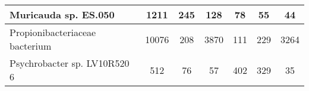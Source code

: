 \begin{minipage}{0.91\textwidth}
\begin{adjustbox}{center}
\begin{tabular}{|l||c|c|c|c|c|c|}
\hline
Muricauda sp. ES.050 & \cellcolor[RGB]{235, 71, 71} 1211 & \cellcolor[RGB]{235, 71, 71} 245 & \cellcolor[RGB]{253, 237, 237} 128 & \cellcolor[RGB]{241, 241, 253} 78 & \cellcolor[RGB]{227, 227, 252} 55 & \cellcolor[RGB]{223, 223, 251} 44 \\
\hline
Propionibacteriaceae bacterium & \cellcolor[RGB]{235, 71, 71} 10076 & \cellcolor[RGB]{232, 232, 252} 208 & \cellcolor[RGB]{251, 223, 223} 3870 & \cellcolor[RGB]{232, 232, 252} 111 & \cellcolor[RGB]{232, 232, 252} 229 & \cellcolor[RGB]{252, 232, 232} 3264 \\
\hline
Psychrobacter sp. LV10R520 6 & \cellcolor[RGB]{249, 200, 200} 512 & \cellcolor[RGB]{232, 232, 252} 76 & \cellcolor[RGB]{232, 232, 252} 57 & \cellcolor[RGB]{251, 223, 223} 402 & \cellcolor[RGB]{252, 232, 232} 329 & \cellcolor[RGB]{227, 227, 252} 35 \\
\hline
\end{tabular}
\end{adjustbox}
\end{minipage}
